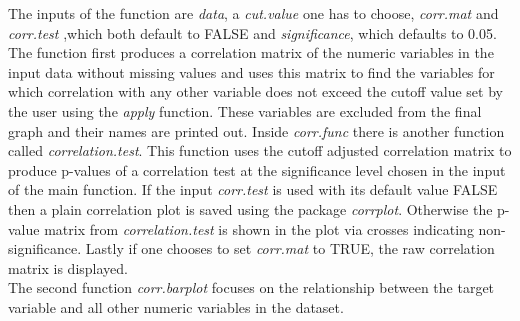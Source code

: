 The inputs of the function are \textit{data}, a \textit{cut.value} one has to choose, \textit{corr.mat} and \textit{corr.test} ,which both default to FALSE and \textit{significance}, which defaults to 0.05. The function first produces a correlation matrix of the numeric variables in the input data without missing values and uses this matrix to find the variables for which correlation with any other variable does not exceed the cutoff value set by the user using the \textit{apply} function. These variables are excluded from the final graph and their names are printed out. Inside \textit{corr.func} there is another function called \textit{correlation.test}. This function uses the cutoff adjusted correlation matrix to produce p-values of a correlation test at the significance level chosen in the input of the main function. If the input \textit{corr.test} is used with its default value FALSE then a plain correlation plot is saved using the package \textit{corrplot}. Otherwise the p-value matrix from \textit{correlation.test} is shown in the plot via crosses indicating non-significance. Lastly if one chooses to set \textit{corr.mat} to TRUE, the raw correlation matrix is displayed. \\
The second function \textit{corr.barplot} focuses on the relationship between the target variable and all other numeric variables in the dataset. 
